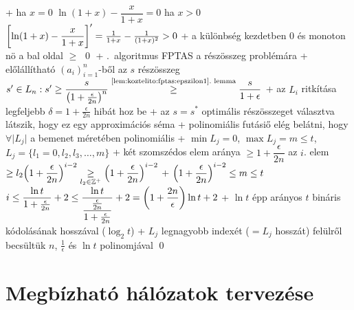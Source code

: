   + ha $x = 0$ \RA $\ln (1 + x) - \dfrac{x}{1 + x} = 0$\qquad
    ha $x > 0$ \RA $\mleft[\ln (1 + x) - \dfrac{x}{1 + x} \mright]' =
    \frac{1}{1 + x} - \frac{1}{(1 + x)^2} > 0$
  + a különbség kezdetben $0$ és monoton nö \RA a bal oldal $\ge$ \qed
+ \thm {}.~algoritmus FPTAS a részösszeg
  problémára
  + \proof előlállítható $(a_i)_{i = 1}^n$-ből az $s$ részösszeg \RA $s'
    \in L_n : s' \ge \dfrac{s}{\bigl(1 + \frac{\epsilon}{2n}\bigr)^n}
    \overset{\text{\ref{lem:koztelito:fptas:epszilon1}.~lemma}}{\ge}
    \dfrac{s}{1 + \epsilon}$
    + az $L_i$ ritkítása legfeljebb $\delta = 1 + \frac{\epsilon}{2n}$
      hibát hoz be
    + az $s = s^*$ optimális részösszeget választva látszik, hogy
      ez egy approximációs séma
  + polinomiális futásiő \LA elég belátni, hogy $\forall \lvert L_j \rvert$ a
    bemenet méretében polinomiális
    + $\min L_j = 0$, $\max L_j = m \le t$, $L_j = \{ l_1 = 0, l_2, l_3,
      \ldots, m \}$
    + két szomszédos elem aránya $\ge 1 + \dfrac{\epsilon}{2n}$ \RA az
      $i$. elem $\ge l_2 \mleft(1 + \dfrac{\epsilon}{2n}\mright)^{i - 2}
      \underset{l_2 \in \ZZ^+}{\ge} \mleft(1 +
      \dfrac{\epsilon}{2n}\mright)^{i - 2}$
    + $\mleft(1 + \dfrac{\epsilon}{2n}\mright)^{i - 2} \le m \le t$
      \RA $i \le \dfrac{\ln t}{1 + \frac{\epsilon}{2n}} + 2 \le
      \dfrac{\ln t}{\dfrac{\frac{\epsilon}{2n}}{1 +
          \frac{\epsilon}{2n}}} + 2 = \mleft(1 +
      \dfrac{2n}{\epsilon}\mright) \ln t + 2$
      + $\ln t$ épp arányos $t$ bináris kódolásának hosszával ($\log_2
        t$)
      + $L_j$ legnagyobb indexét ($= L_j$ hosszát) felülről becsültük
        $n$, $\frac{1}{\epsilon}$ és $\ln t$ polinomjával \qed


\section{Megbízható hálózatok tervezése}

